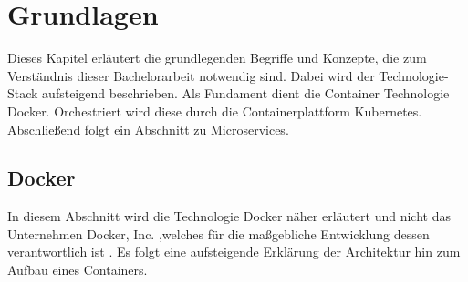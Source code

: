 \chapter{Grundlagen}
Dieses Kapitel erläutert die grundlegenden Begriffe und Konzepte, die zum 
Verständnis dieser Bachelorarbeit notwendig sind. 
Dabei wird der Technologie-Stack aufsteigend beschrieben.
Als Fundament dient die Container Technologie Docker.
Orchestriert wird diese durch die Containerplattform Kubernetes.
Abschließend folgt ein Abschnitt zu Microservices.


\section{Docker} \label{Docker}

In diesem Abschnitt wird die Technologie Docker näher erläutert und
nicht das Unternehmen Docker, Inc. ,welches für die maßgebliche Entwicklung dessen verantwortlich ist \cite[S.11]{dockerdeep}.
Es folgt eine aufsteigende Erklärung der Architektur hin zum Aufbau eines Containers.


